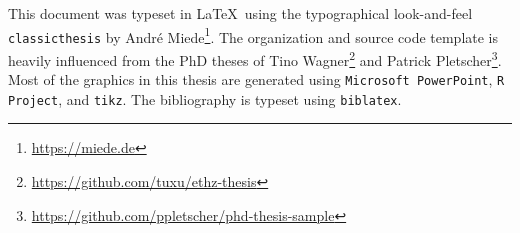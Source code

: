 \thispagestyle{empty}

\hfill

\vfill

\noindent{}

\vspace{0.4cm}

\noindent This document was typeset in \LaTeX\ using the typographical look-and-feel \texttt{classicthesis} by Andr\'e Miede\footnote{\url{https://miede.de}}. The organization and source code template is heavily influenced from the PhD theses of Tino Wagner\footnote{\url{https://github.com/tuxu/ethz-thesis}} and Patrick Pletscher\footnote{\url{https://github.com/ppletscher/phd-thesis-sample}}. Most of the graphics in this thesis are  generated using \texttt{Microsoft PowerPoint}, \texttt{R Project}, and \texttt{tikz}. The bibliography is typeset using \texttt{biblatex}.